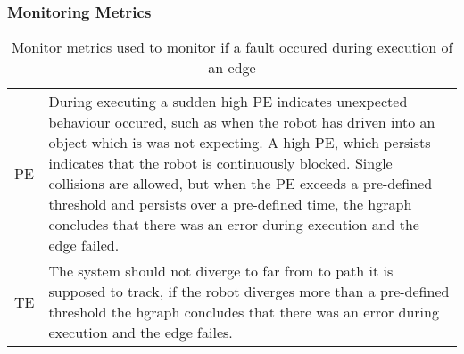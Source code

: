 \subsubsection{Monitoring Metrics}
\begin{table}[htb!]
\centering
\begin{tabular}[t]{l p{10cm}}
  \acf{PE}&  During executing a sudden high \ac{PE} indicates unexpected behaviour occured, such as when the robot has driven into an object which is was not expecting. A high \ac{PE}, which persists indicates that the robot is continuously blocked. Single collisions are allowed, but when the \ac{PE} exceeds a pre-defined threshold and persists over a pre-defined time, the \ac{hgraph} concludes that there was an error during execution and the edge failed.\\
  \acf{TE}& The system should not diverge to far from to path it is supposed to track, if the robot diverges more than a pre-defined threshold the \ac{hgraph} concludes that there was an error during execution and the edge failes. \\
\end{tabular}
\caption{Monitor metrics used to monitor if a fault occured during execution of an edge}%
\label{table:monitoring_edge_metrics}
\end{table}


